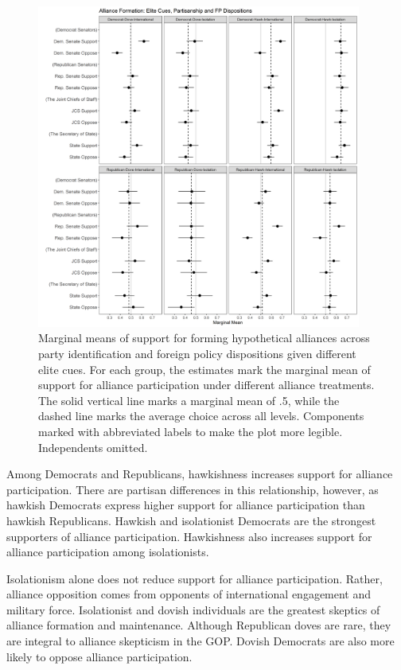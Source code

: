 \documentclass[12pt]{article}
\begin{document}
\begin{figure}[htpb]
	\centering
		\includegraphics[width=0.95\textwidth]{../figures/party-dispo-form-el.png}
	\caption{Marginal means of support for forming hypothetical alliances across party identification and foreign policy dispositions given different elite cues. For each group, the estimates mark the marginal mean of support for alliance participation under different alliance treatments. The solid vertical line marks a marginal mean of .5, while the dashed line marks the average choice across all levels. Components marked with abbreviated labels to make the plot more legible. Independents omitted.}
	\label{fig:party-dispo-form-el}
\end{figure}


Among Democrats and Republicans, hawkishness increases support for alliance participation. 
There are partisan differences in this relationship, however, as hawkish Democrats express higher support for alliance participation than hawkish Republicans. 
Hawkish and isolationist Democrats are the strongest supporters of alliance participation. 
Hawkishness also increases support for alliance participation among isolationists. 


Isolationism alone does not reduce support for alliance participation.
Rather, alliance opposition comes from opponents of international engagement and military force. 
Isolationist and dovish individuals are the greatest skeptics of alliance formation and maintenance. 
Although Republican doves are rare, they are integral to alliance skepticism in the GOP. 
Dovish Democrats are also more likely to oppose alliance participation.  
\end{document}
